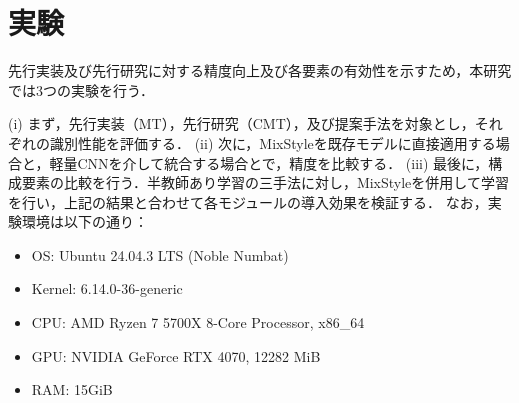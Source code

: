 \documentclass[main]{subfiles}
\begin{document}
\section{実験}
    \label{実験}
先行実装及び先行研究に対する精度向上及び各要素の有効性を示すため，本研究では3つの実験を行う．\par 
(i) まず，先行実装（MT），先行研究（CMT），及び提案手法を対象とし，それぞれの識別性能を評価する．
(ii) 次に，MixStyleを既存モデルに直接適用する場合と，軽量CNNを介して統合する場合とで，精度を比較する．
(iii) 最後に，構成要素の比較を行う．半教師あり学習の三手法に対し，MixStyleを併用して学習を行い，上記の結果と合わせて各モジュールの導入効果を検証する．
なお，実験環境は以下の通り：
{\footnotesize
\begin{itemize}
    \item OS: Ubuntu 24.04.3 LTS (Noble Numbat) 
    \item Kernel: 6.14.0-36-generic
	\item CPU: AMD Ryzen 7 5700X 8-Core Processor, x86\_64
	\item GPU: NVIDIA GeForce RTX 4070, 12282 MiB
	\item RAM: 15GiB
\end{itemize}
}
\end{document}
